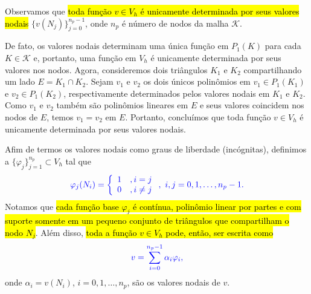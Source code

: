 Observamos que \hl{toda função $v\in V_h$ é unicamente determinada por seus valores nodais} $\{v(N_j)\}_{j=0}^{n_p-1}$, onde $n_p$ é número de nodos da malha $\mathcal{K}$. 

De fato, os valores nodais determinam uma única função em $P_1(K)$ para cada $K\in\mathcal{K}$ e, portanto, uma função em $V_h$ é unicamente determinada por seus valores nos nodos. Agora, consideremos dois triângulos $K_1$ e $K_2$ compartilhando um lado $E = K_1\cap K_2$. Sejam $v_1$ e $v_2$ os dois únicos polinômios em $v_1\in P_1(K_1)$ e $v_2\in P_1(K_2)$, respectivamente determinados pelos valores nodais em $K_1$ e $K_2$. Como $v_1$ e $v_2$ também são polinômios lineares em $E$ e seus valores coincidem nos nodos de $E$, temos $v_1 = v_2$ em $E$. Portanto, concluímos que toda função $v\in V_h$ é unicamente determinada por seus valores nodais.

Afim de termos os valores nodais como graus de liberdade (incógnitas), definimos a  $\{\varphi_j\}_{j=1}^{n_p}\subset V_h$ tal que
\begin{equation}\color{blue}\varphi_j(N_i) = \left\{
    \begin{array}{ll}
      1 &, i=j\\
      0 &, i\neq j
    \end{array}
\right.,~i,j=0, 1, \dotsc, n_p-1.
\end{equation}
Notamos que \hl{cada função base $\varphi_j$ é contínua, polinômio linear por partes e com suporte somente em um pequeno conjunto de triângulos que compartilham o nodo $N_j$}. Além disso, \hl{toda a função $v\in V_h$ pode, então, ser escrita como}
\begin{equation}\color{blue}v = \sum_{i=0}^{n_p-1}\alpha_i\varphi_i,
\end{equation}
onde $\alpha_i = v(N_i)$, $i=0, 1, \ldots, n_p$, são os valores nodais de $v$.

